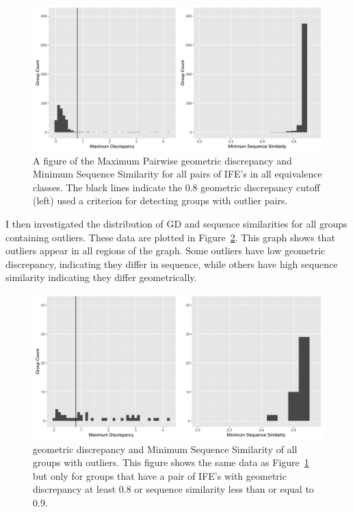 \begin{figure}[h]
  \includegraphics[width=\textwidth]{chapter-3/figs/eq-summary}
  \caption{A figure of the Maximum Pairwise geometric discrepancy and Minimum Sequence
    Similarity for all pairs of IFE's in all equivalence classes. The black
    lines indicate the 0.8 geometric discrepancy cutoff (left) used a criterion for
  detecting groups with outlier pairs.}
\label{fig:eq-summary}
\end{figure}

I then investigated the distribution of GD and sequence similarities for all
groups containing outliers. These data are plotted in
Figure~\ref{fig:eq-outlier-summary}. This graph shows that outliers appear in
all regions of the graph. Some outliers have low geometric discrepancy,
indicating they differ in sequence, while others have high sequence similarity
indicating they differ geometrically.

\begin{figure}[h]
  \includegraphics[width=\textwidth]{chapter-3/figs/outlier-summary}
  \caption{geometric discrepancy and Minimum Sequence Similarity of all groups with
  outliers. This figure shows the same data as Figure~\ref{fig:eq-summary} but
only for groups that have a pair of IFE's with geometric discrepancy at least 0.8 or
sequence similarity less than or equal to 0.9.}
\label{fig:eq-outlier-summary}
\end{figure}

